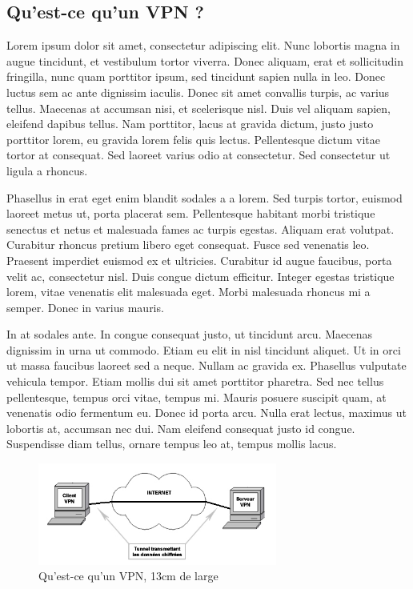 \documentclass[a4paper,12pt]{report}
\begin{document}
\subsection{Qu'est-ce qu'un VPN ?} %
Lorem ipsum dolor sit amet, consectetur adipiscing elit. Nunc lobortis magna in augue tincidunt, et vestibulum tortor viverra. Donec aliquam, erat et sollicitudin fringilla, nunc quam porttitor ipsum, sed tincidunt sapien nulla in leo. Donec luctus sem ac ante dignissim iaculis. Donec sit amet convallis turpis, ac varius tellus. Maecenas at accumsan nisi, et scelerisque nisl. Duis vel aliquam sapien, eleifend dapibus tellus. Nam porttitor, lacus at gravida dictum, justo justo porttitor lorem, eu gravida lorem felis quis lectus. Pellentesque dictum vitae tortor at consequat. Sed laoreet varius odio at consectetur. Sed consectetur ut ligula a rhoncus.

Phasellus in erat eget enim blandit sodales a a lorem. Sed turpis tortor, euismod laoreet metus ut, porta placerat sem. Pellentesque habitant morbi tristique senectus et netus et malesuada fames ac turpis egestas. Aliquam erat volutpat. Curabitur rhoncus pretium libero eget consequat. Fusce sed venenatis leo. Praesent imperdiet euismod ex et ultricies. Curabitur id augue faucibus, porta velit ac, consectetur nisl. Duis congue dictum efficitur. Integer egestas tristique lorem, vitae venenatis elit malesuada eget. Morbi malesuada rhoncus mi a semper. Donec in varius mauris.

In at sodales ante. In congue consequat justo, ut tincidunt arcu. Maecenas dignissim in urna ut commodo. Etiam eu elit in nisl tincidunt aliquet. Ut in orci ut massa faucibus laoreet sed a neque. Nullam ac gravida ex. Phasellus vulputate vehicula tempor. Etiam mollis dui sit amet porttitor pharetra. Sed nec tellus pellentesque, tempus orci vitae, tempus mi. Mauris posuere suscipit quam, at venenatis odio fermentum eu. Donec id porta arcu. Nulla erat lectus, maximus ut lobortis at, accumsan nec dui. Nam eleifend consequat justo id congue. Suspendisse diam tellus, ornare tempus leo at, tempus mollis lacus.

\begin{figure}[H]
  \centering
  \includegraphics[width=0.7\textwidth]{image/images/vpn1}
  \caption{Qu’est-ce qu’un VPN, 13cm de large}
\end{figure}
\end{document}
